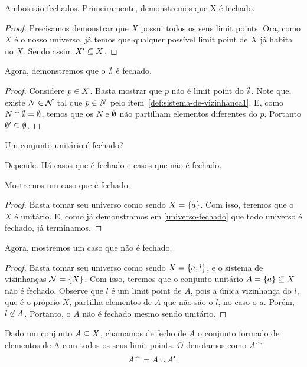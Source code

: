 \begin{answer}
	Ambos são fechados. Primeiramente, demonstremos que X é fechado.
	\begin{proof}
		Precisamos demonstrar que $X$ possui todos os seus limit points. Ora, como $X$ é o nosso universo, já temos que qualquer possível limit point de $X$ já habita no $X$. Sendo assim $X^{\prime} \subseteq X$.
	\end{proof}

	Agora, demonstremos que o $\emptyset$ é fechado.
	\begin{proof}
		Considere $p \in X$. Basta mostrar que $p$ não é limit point do $\emptyset$. Note que, existe $N \in \mathcal{N}$ tal que $p \in N$ pelo item~\ref{def:sistema-de-vizinhanca1}. E, como $N \cap \emptyset = \emptyset$, temos que os $N$ e $\emptyset$ não partilham elementos diferentes do $p$. Portanto $\emptyset^{\prime} \subseteq \emptyset$.
	\end{proof}
\end{answer}

\begin{question}[Q1.16.]
	Um conjunto unitário é fechado?
\end{question}

\begin{answer}
	Depende. Há casos que é fechado e casos que não é fechado.
	
	Mostremos um caso que é fechado.
	\begin{proof}	
		Basta tomar seu universo como sendo $X = \left\{a\right\}$. Com isso, teremos que o $X$ é unitário. E, como já demonstramos em \ref{universo-fechado} que todo universo é fechado, já terminamos. 
	\end{proof}

	Agora, mostremos um caso que não é fechado.
	\begin{proof}
		Basta tomar seu universo como sendo $X = \left\{a,l\right\}$, e o sistema de vizinhanças $\mathcal{N} = \left\{X\right\}$. Com isso, teremos que o conjunto unitário $A = \left\{a\right\} \subseteq X$ não é fechado. Observe que $l$ é um limit point de $A$, pois a única vizinhança do $l$, que é o próprio $X$, partilha elementos de $A$ que não são o $l$, no caso o $a$. Porém, $l \not\in A$. Portanto, o $A$ não é fechado mesmo sendo unitário.
	\end{proof}
\end{answer}

\begin{definition}
	Dado um conjunto $A \subseteq X$, chamamos de fecho de $A$ o conjunto formado de elementos de A com todos os seus limit points. O denotamos como $A^{\frown}$.
	\[
		A^{\frown} = A \cup A^{\prime}.
	\]
\end{definition}


